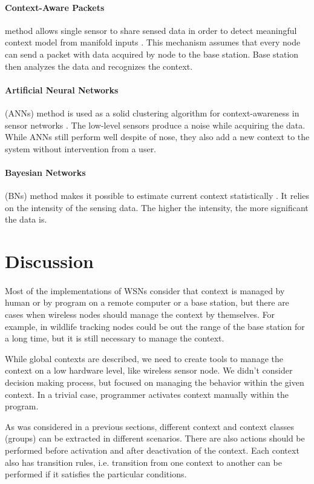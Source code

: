 \documentclass[12pt,a4paper]{article}
\begin{document}
\paragraph{Context-Aware Packets}method allows single sensor to share sensed data in order to detect meaningful context model from manifold inputs \cite{michahelles02}. This mechanism assumes that every node can send a packet with data acquired by node to the base station. Base station then analyzes the data and recognizes the context.
\paragraph{Artificial Neural Networks}(ANNs) method is used as a solid clustering algorithm for context-awareness in sensor networks \cite{korel10}. The low-level sensors produce a noise while acquiring the data. While ANNs still perform well despite of nose, they also add a new context to the system without intervention from a user.
\paragraph{Bayesian Networks}(BNs) method makes it possible to estimate current context statistically \cite{korel10}. It relies on the intensity of the sensing data. The higher the intensity, the more significant the data is.

\section{Discussion}
\paragraph{}
Most of the implementations of WSNs consider that context is managed by human or by program on a remote computer or a base station, but there are cases when wireless nodes should manage the context by themselves. For example, in wildlife tracking nodes could be out the range of the base station for a long time, but it is still necessary to manage the context.

While global contexts are described, we need to create tools to manage the context on a low hardware level, like wireless sensor node. We didn't consider decision making process, but focused on managing the behavior within the given context. In a trivial case, programmer activates context manually within the program.

As was considered in a previous sections, different context and context classes (groups) can be extracted in different scenarios. There are also actions should be performed before activation and after deactivation of the context. Each context also has transition rules, i.e. transition from one context to another can be performed if it satisfies the particular conditions.
\end{document}

